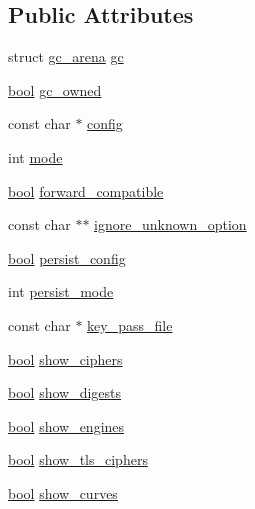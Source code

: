 \subsection*{Public Attributes}
\begin{DoxyCompactItemize}
\item 
struct \hyperlink{structgc__arena}{gc\+\_\+arena} \hyperlink{structoptions_aa397848a05d2511b2aaf320f5edb65d2}{gc}
\item 
\hyperlink{automatic_8c_abb452686968e48b67397da5f97445f5b}{bool} \hyperlink{structoptions_aa44383fcd0939cf9024027cbfa6386be}{gc\+\_\+owned}
\item 
const char $\ast$ \hyperlink{structoptions_ab10b9cdcad048c3ef63cdae7ffd09444}{config}
\item 
int \hyperlink{structoptions_a8a97f5f530042a7f4321cb97c3983fa1}{mode}
\item 
\hyperlink{automatic_8c_abb452686968e48b67397da5f97445f5b}{bool} \hyperlink{structoptions_a827f7c7f522afec6e2c666bbc754296b}{forward\+\_\+compatible}
\item 
const char $\ast$$\ast$ \hyperlink{structoptions_aa0bdd5f970f790178b6d61e62e21aefc}{ignore\+\_\+unknown\+\_\+option}
\item 
\hyperlink{automatic_8c_abb452686968e48b67397da5f97445f5b}{bool} \hyperlink{structoptions_a0fa2c5ba57c9ffb4a898bafc3725e88f}{persist\+\_\+config}
\item 
int \hyperlink{structoptions_a46e9ecdbdf449d7298f3fe42d587b5f4}{persist\+\_\+mode}
\item 
const char $\ast$ \hyperlink{structoptions_a69bd45d624f2701927f2d71589f402ee}{key\+\_\+pass\+\_\+file}
\item 
\hyperlink{automatic_8c_abb452686968e48b67397da5f97445f5b}{bool} \hyperlink{structoptions_a98fc9a0879158d9aaf12696ff8726b35}{show\+\_\+ciphers}
\item 
\hyperlink{automatic_8c_abb452686968e48b67397da5f97445f5b}{bool} \hyperlink{structoptions_a4aa894e058d4e005aa5c533183f86439}{show\+\_\+digests}
\item 
\hyperlink{automatic_8c_abb452686968e48b67397da5f97445f5b}{bool} \hyperlink{structoptions_a6627153e6bb2d0952fce58f65ee07329}{show\+\_\+engines}
\item 
\hyperlink{automatic_8c_abb452686968e48b67397da5f97445f5b}{bool} \hyperlink{structoptions_a73c23de77b777cbd7a59bea56f1ee366}{show\+\_\+tls\+\_\+ciphers}
\item 
\hyperlink{automatic_8c_abb452686968e48b67397da5f97445f5b}{bool} \hyperlink{structoptions_a916e724576aa058a30902dc1c34862e8}{show\+\_\+curves}
$$
\end{DoxyCompactItemize}
